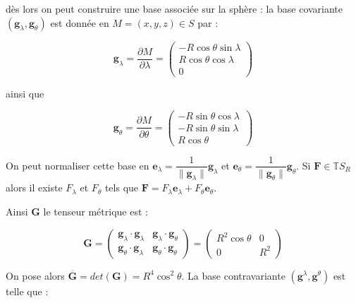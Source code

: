 dès lors on peut construire une base associée sur la sphère : la base covariante $( \mathbf{g}_{\lambda}, \mathbf{g}_{\theta})$ est donnée en $M = (x,y,z) \in S$ par :

\begin{equation}
\mathbf{g}_{\lambda} = \dfrac{\partial M}{\partial \lambda} = \begin{pmatrix}
- R \cos \theta \sin \lambda \\ 
R \cos \theta \cos \lambda \\ 
0
\end{pmatrix} 
\end{equation}

ainsi que 

\begin{equation}\label{coord_latlon}
\mathbf{g}_{\theta} = \dfrac{\partial M}{\partial \theta} = \begin{pmatrix}
- R \sin \theta \cos \lambda \\ 
- R \sin \theta \sin \lambda \ \\ 
R \cos \theta
\end{pmatrix} 
\end{equation}

\begin{remarque}
\label{base_lonlat}
On peut normaliser cette base en $\mathbf{e}_{\lambda} = \dfrac{1}{\| \mathbf{g}_{\lambda} \|} \mathbf{g}_{\lambda}$ et $\mathbf{e}_{\theta} = \dfrac{1}{\| \mathbf{g}_{\theta} \|} \mathbf{g}_{\theta}$. Si $\mathbf{F} \in \mathbb{T}S_R$ alors il existe $F_{\lambda}$ et $F_{\theta}$ tels que $\mathbf{F} = F_{\lambda} \mathbf{e}_{\lambda} + F_{\theta} \mathbf{e}_{\theta}$.
\end{remarque}

Ainsi $\mathbf{G}$ le tenseur métrique est :

\begin{equation}
\mathbf{G} = 
\begin{pmatrix}
\mathbf{g}_{\lambda} \cdot \mathbf{g}_{\lambda} & \mathbf{g}_{\lambda} \cdot \mathbf{g}_{\theta} \\
\mathbf{g}_{\theta} \cdot \mathbf{g}_{\lambda} & \mathbf{g}_{\theta} \cdot \mathbf{g}_{\theta}
\end{pmatrix}
 =
\begin{pmatrix}
R^2 \cos \theta & 0 \\
0 & R^2
\end{pmatrix}
\end{equation}

On pose alors $\overline{\mathbf{G}} = det (\mathbf{G}) = R^4 \cos^2 \theta$. La base contravariante $( \mathbf{g}^{\lambda}, \mathbf{g}^{\theta} ) $ est telle que :

